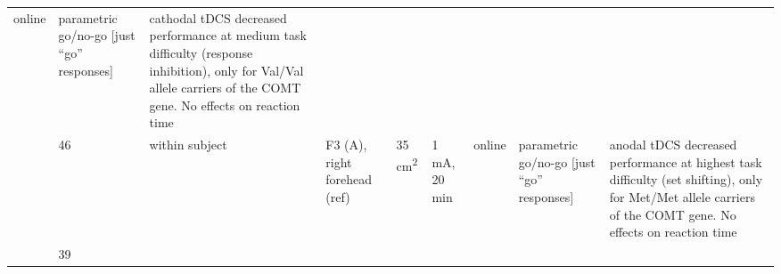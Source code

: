 \documentclass[11pt,]{memoir}
\begin{document}
\begin{longtable}[]{@{}lllllllll@{}}
\begin{minipage}[t]{0.06\columnwidth}
online\strut
\end{minipage} & \begin{minipage}[t]{0.11\columnwidth}\raggedright
parametric go/no-go {[}just
``go'' responses{]}\strut
\end{minipage} & \begin{minipage}[t]{0.24\columnwidth}\raggedright
cathodal tDCS decreased performance at medium task
difficulty (response inhibition), only for Val/Val
allele carriers of the COMT gene. No effects on
reaction time\strut
\end{minipage}\tabularnewline
\begin{minipage}[t]{0.08\columnwidth}\raggedright
\textcite{Plewnia2013}\strut
\end{minipage} & \begin{minipage}[t]{0.02\columnwidth}\raggedright
46\strut
\end{minipage} & \begin{minipage}[t]{0.04\columnwidth}\raggedright
within
subject\strut
\end{minipage} & \begin{minipage}[t]{0.13\columnwidth}\raggedright
F3 (A), right forehead (ref)\strut
\end{minipage} & \begin{minipage}[t]{0.03\columnwidth}\raggedright
35
cm\textsuperscript{2}\strut
\end{minipage} & \begin{minipage}[t]{0.05\columnwidth}\raggedright
1 mA, 20
min\strut
\end{minipage} & \begin{minipage}[t]{0.06\columnwidth}\raggedright
online\strut
\end{minipage} & \begin{minipage}[t]{0.11\columnwidth}\raggedright
parametric go/no-go {[}just
``go'' responses{]}\strut
\end{minipage} & \begin{minipage}[t]{0.24\columnwidth}\raggedright
anodal tDCS decreased performance at highest task
difficulty (set shifting), only for Met/Met allele
carriers of the COMT gene. No effects on reaction time\strut
\end{minipage}\tabularnewline
\begin{minipage}[t]{0.08\columnwidth}\raggedright
\textcite{Hsu2015}\strut
\end{minipage} & \begin{minipage}[t]{0.02\columnwidth}\raggedright
39\strut
\end{minipage} & \begin{minipage}[t]{0.04\columnwidth}\raggedright

\end{minipage}
\end{longtable}
\end{document}
